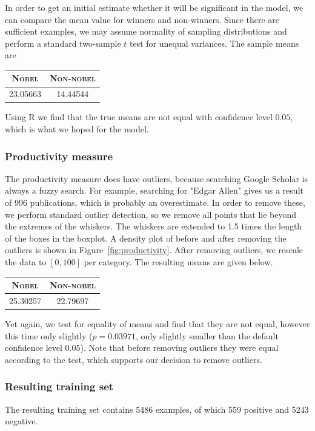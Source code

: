 In order to get an initial estimate whether it will be significant in the model, we can compare the mean value for winners and non-winners. Since there are sufficient examples, we may assume normality of sampling distributions and perform a standard two-sample $t$ test for unequal variances. The sample means are 
\begin{table}[H]
\centering
\begin{tabular}{c|c}
\textbf{\textsc{Nobel}} & \textbf{\textsc{Non-nobel}} \\ \hline
\rule{0pt}{4mm}23.05663&14.44544\\
\end{tabular}
\end{table} 
\noindent Using R we find that the true means are not equal with confidence level $0.05$, which is what we hoped for the model.

\subsubsection{Productivity measure}
\label{sssec:productivity}
The productivity measure does have outliers, because searching Google Scholar is always a fuzzy search. For example, searching for "Edgar Allen" gives us a result of 996 publications, which is  probably an overestimate. In order to remove these, we perform standard outlier detection, so we remove all points that lie beyond the extremes of the whiskers. The whiskers are extended to 1.5 times the length of the boxes in the boxplot. A density plot of before and after removing the outliers is shown in Figure~\ref{fig:productivity}.
After removing outliers, we rescale the data to $[0, 100]$ per category. The resulting means are given below.
\begin{table}[H]
\centering
\begin{tabular}{c|c}
\textbf{\textsc{Nobel}} & \textbf{\textsc{Non-nobel}} \\ \hline
\rule{0pt}{4mm}25.30257&22.79697 \\
\end{tabular}
\end{table}
\noindent Yet again, we test for equality of means and find that they are not equal, however this time only slightly ($p = 0.03971$, only slightly smaller than the default confidence level $0.05$). Note that before removing outliers they were equal according to the test, which supports our decision to remove outliers.

\subsubsection{Resulting training set}
The resulting training set contains 5486 examples, of which 559 positive and 5243 negative.

